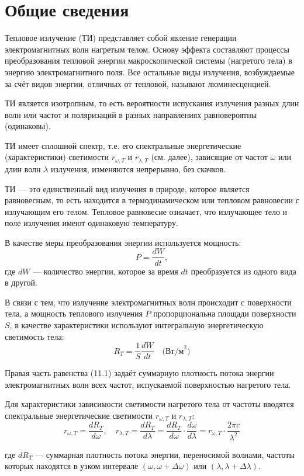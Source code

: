 \section{Общие сведения}

Тепловое излучение (ТИ) представляет собой явление генерации электромагнитных волн нагретым телом. Основу эффекта составляют процессы преобразования тепловой энергии макроскопической системы (нагретого тела) в энергию электромагнитного поля. Все остальные виды излучения, возбуждаемые за счёт видов энергии, отличных от тепловой, называют люминесценцией.

ТИ является изотропным, то есть вероятности испускания излучения разных длин волн или частот и поляризаций в разных направлениях равновероятны (одинаковы).

ТИ имеет сплошной спектр, т.е. его спектральные энергетические (характеристики) светимости \( r_{\omega,T} \) и \( r_{\lambda,T} \) (см. далее), зависящие от частот \( \omega \) или длин волн \( \lambda \) излучения, изменяются непрерывно, без скачков.

ТИ — это единственный вид излучения в природе, которое является равновесным, то есть находится в термодинамическом или тепловом равновесии с излучающим его телом. Тепловое равновесие означает, что излучающее тело и поле излучения имеют одинаковую температуру.

В качестве меры преобразования энергии используется мощность:
\[
P = \frac{dW}{dt},
\]
где \( dW \) — количество энергии, которое за время \( dt \) преобразуется из одного вида в другой.

В связи с тем, что излучение электромагнитных волн происходит с поверхности тела, а мощность теплового излучения \( P \) пропорциональна площади поверхности \( S \), в качестве характеристики используют интегральную энергетическую светимость тела:
\[
R_T = \frac{1}{S} \frac{dW}{dt} \quad \text{(Вт/м}^2\text{)} \tag{11.1}
\]

Правая часть равенства (11.1) задаёт суммарную плотность потока энергии электромагнитных волн всех частот, испускаемой поверхностью нагретого тела.

Для характеристики зависимости светимости нагретого тела от частоты вводятся спектральные энергетические светимости \( r_{\omega,T} \) и \( r_{\lambda,T} \):
\[
r_{\omega,T} = \frac{dR_T}{d\omega}, \quad
r_{\lambda,T} = \frac{dR_T}{d\lambda} = \frac{dR_T}{d\omega} \cdot \frac{d\omega}{d\lambda} = r_{\omega,T} \cdot \frac{2\pi c}{\lambda^2} \tag{11.2}
\]

где \( dR_T \) — суммарная плотность потока энергии, переносимой волнами, частоты которых находятся в узком интервале \( (\omega, \omega + \Delta\omega) \) или \( (\lambda, \lambda + \Delta\lambda) \).


